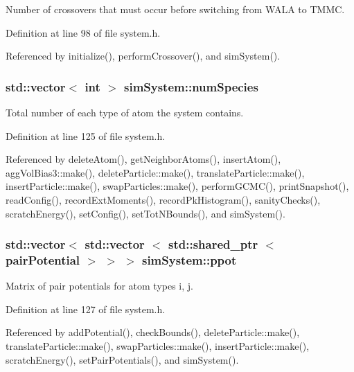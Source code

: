 Number of crossovers that must occur before switching from W\-A\-L\-A to T\-M\-M\-C. 



Definition at line 98 of file system.\-h.



Referenced by initialize(), perform\-Crossover(), and sim\-System().

\hypertarget{classsim_system_a9eea865e6dc1cff377b1e79c4d9c23f0}{
\subsubsection[{num\-Species}]{\setlength{\rightskip}{0pt plus 5cm}std\-::vector$<$ int $>$ sim\-System\-::num\-Species}}\label{classsim_system_a9eea865e6dc1cff377b1e79c4d9c23f0}


Total number of each type of atom the system contains. 



Definition at line 125 of file system.\-h.



Referenced by delete\-Atom(), get\-Neighbor\-Atoms(), insert\-Atom(), agg\-Vol\-Bias3\-::make(), delete\-Particle\-::make(), translate\-Particle\-::make(), insert\-Particle\-::make(), swap\-Particles\-::make(), perform\-G\-C\-M\-C(), print\-Snapshot(), read\-Config(), record\-Ext\-Moments(), record\-Pk\-Histogram(), sanity\-Checks(), scratch\-Energy(), set\-Config(), set\-Tot\-N\-Bounds(), and sim\-System().

\hypertarget{classsim_system_ad2e290b5963f132e6a3a56cee35c8e9f}{
\subsubsection[{ppot}]{\setlength{\rightskip}{0pt plus 5cm}std\-::vector$<$ std\-::vector $<$ std\-::shared\-\_\-ptr $<$ {\bf pair\-Potential} $>$ $>$ $>$ sim\-System\-::ppot}}\label{classsim_system_ad2e290b5963f132e6a3a56cee35c8e9f}


Matrix of pair potentials for atom types i, j. 



Definition at line 127 of file system.\-h.



Referenced by add\-Potential(), check\-Bounds(), delete\-Particle\-::make(), translate\-Particle\-::make(), swap\-Particles\-::make(), insert\-Particle\-::make(), scratch\-Energy(), set\-Pair\-Potentials(), and sim\-System().

